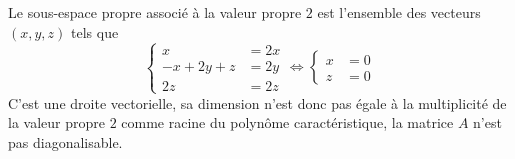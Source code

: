 {\begin{enumerate}
{Le sous-espace propre associé à la valeur propre $2$ est l'ensemble des vecteurs $(x,y,z)$ tels que 
$$\left\{\begin{align*}x&=2x \\  -x+2y+z&=2y \\  2z&=2z\end{align*}\right.\iff\left\{\begin{align*}x&=0 \\   z&=0\end{align*}\right.$$
C'est une droite vectorielle, sa dimension n'est donc pas égale à la multiplicité de la valeur propre $2$ comme racine du polynôme caractéristique, la matrice $A$ n'est pas diagonalisable.}
\end{enumerate}
}
